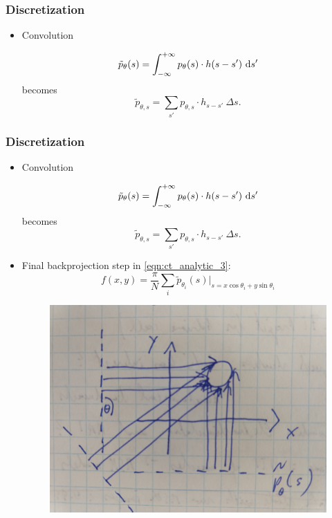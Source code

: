 \begin{frame}
	\frametitle{Discretization}

	\begin{itemize}
		\item Convolution


		      \begin{equation}
			      \tilde{p}_{\theta}(s) = \int_{-\infty}^{+\infty} p_\theta(s) \cdot h(s - s') \ \textnormal d s'
		      \end{equation}
		      becomes
		      \begin{equation}
			      \tilde{p}_{\theta, s} = \sum_{s'} p_{\theta, s} \cdot h_{s - s'}\ \Delta s.
		      \end{equation}

		
	\end{itemize}

\end{frame}


\begin{frame}
	\frametitle{Discretization}

	\begin{itemize}
		\item Convolution


		      \begin{equation}
			      \tilde{p}_{\theta}(s) = \int_{-\infty}^{+\infty} p_\theta(s) \cdot h(s - s') \ \textnormal d s'
		      \end{equation}
		      becomes
		      \begin{equation}
			      \tilde{p}_{\theta, s} = \sum_{s'} p_{\theta, s} \cdot h_{s - s'}\ \Delta s.
		      \end{equation}

		\item Final backprojection step in \eqref{eqn:ct_analytic_3}:
		      \begin{equation}
			      \label{eqn:ct_analytic_3}
			      f(x, y) = \frac{\pi}{N} \sum_i \tilde{p}_{\theta_i}(s) |_{s=x \cos \theta_i + y \sin \theta_i}
		      \end{equation}


	\begin{figure}[tbp]
		\centering
		\includegraphics[width=0.15\linewidth]{images/backprojection_sketch}
	\end{figure}
	
	\end{itemize}

\end{frame}

